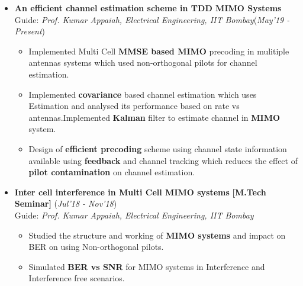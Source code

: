 \documentclass[10pt]{article}
\begin{document}

\vspace*{115pt}    %

\colorbox{bl}{}%
\vspace{-0.1cm}
\begin{itemize}[leftmargin=0.4cm]


\item \textbf{An efficient channel estimation scheme in TDD MIMO Systems}\\
Guide: \textit{Prof. Kumar Appaiah, Electrical Engineering, IIT Bombay}\hfill{(\textit{May’19 - Present})}\\\vspace{-0.68cm}
	\begin{itemize}[leftmargin=0.5cm]
    \item Implemented Multi Cell \textbf{MMSE based MIMO }precoding in mulitiple antennas systems which used
non-orthogonal pilots for channel estimation.\vspace{-0.1cm}
    \item Implemented \textbf{covariance} based channel estimation which uses  Estimation and analysed its performance based on rate vs antennas.Implemented \textbf{Kalman} filter to estimate channel in \textbf{MIMO} system.\vspace{-0.1cm}
    \item  Design of \textbf{efficient precoding }scheme using channel state information available using \textbf{feedback} and channel
tracking which reduces the effect of \textbf{pilot contamination} on channel estimation.\vspace{-0.1cm}

	\end{itemize}

\vspace{-0.25cm}

\item \textbf{Inter cell interference in Multi Cell MIMO systems 
} \textbf{[M.Tech Seminar]}
\hfill{(\textit{Jul'18 - Nov'18})}\\
Guide: \textit{Prof. Kumar Appaiah, Electrical Engineering, IIT Bombay}\\\vspace{-0.68cm}
	\begin{itemize}
	\item Studied the structure and working of \textbf{MIMO systems} and impact on BER on using Non-orthogonal pilots.\vspace{-0.1cm}
	\item Simulated \textbf{BER vs SNR} for MIMO systems in Interference and Interference free scenarios.\vspace{-0.1cm}

	\end{itemize}\
	\vspace{-0.6cm}	
\end{itemize}
\end{document}

